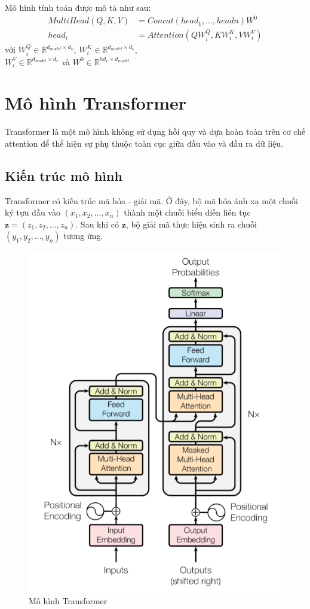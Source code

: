\documentclass[14pt]{extreport}
\begin{document}
Mô hình tính toán được mô tả như sau:
\begin{align}
    MultiHead(Q,K,V)&= Concat(head_{1},...,head{n})W^{0} \\    
    head_{i}&= Attention(QW_{i}^{Q}, KW_{i}^{K}, VW_{i}^{V})
\end{align}
với $W_{i}^{Q}\in \mathbb{R}^{d_{model}\times d_{k}}$, $W_{i}^{K}\in \mathbb{R}^{d_{model}\times d_{k}}$,\\ $W_{i}^{V}\in \mathbb{R}^{d_{model}\times d_{v}}$ và $W^{0}\in \mathbb{R}^{hd_{v}\times d_{model}}$

\section{Mô hình Transformer}
Transformer là một mô hình không sử dụng hồi quy và dựa hoàn toàn trên cơ chế attention để thể hiện sự phụ thuộc toàn cục giữa đầu vào và đầu ra dữ liệu.
\subsection{Kiến trúc mô hình}
Transformer có kiến trúc mã hóa - giải mã. Ở đây, bộ mã hóa ánh xạ một chuỗi ký tựu đầu vào $(x_{1}, x_{2},...,x_{n})$ thành một chuỗi 
biểu diễn liên tục $\textbf{z}=(z_{1}, z_{2},...,z_{n})$. Sau khi có $\textbf{z}$, bộ giải mã thực hiện sinh ra chuỗi $(y_{1}, y_{2},..., y_{n})$ tương ứng.
\begin{figure}
    \centering
    \includegraphics{image/transformer.PNG}
    \caption{Mô hình Transformer}
    \label{fig:Transformer}
\end{figure}
\end{document}
